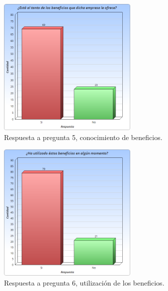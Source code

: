 \begin{figure}[!htb]
    \centering
    \includegraphics[width=0.6\textwidth]{images/Graficos/graf_5_3.png}
    \caption[chart5.3]{Respuesta a pregunta 5, conocimiento de beneficios.}
    \label{fig:chart5.3}
\end{figure}

\begin{figure}[!htb]
    \centering
    \includegraphics[width=0.6\textwidth]{images/Graficos/graf_5_4.png}
    \caption[chart5.4]{Respuesta a pregunta 6, utilización de los beneficios.}
    \label{fig:chart5.4}
\end{figure}

